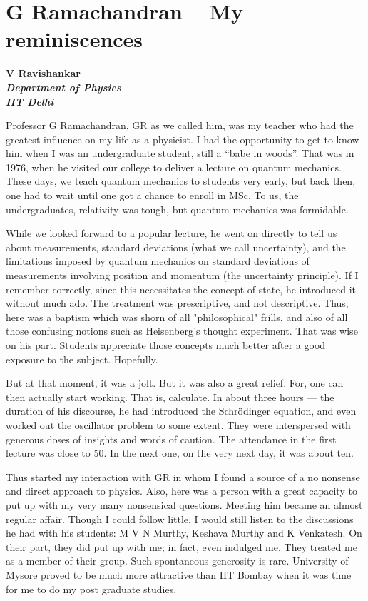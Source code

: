 \chapter[G Ramachandran -- My reminiscences]{\hfill G Ramachandran \break -- My reminiscences}

\begin{center}
\textbf{V Ravishankar}\\
{\it\bfseries Department of Physics}\\
{\it\bfseries IIT Delhi}
\end{center}

Professor G Ramachandran, GR as we called him, was my teacher who had the greatest influence on my life as a physicist. I had the opportunity to get to know him when I was an undergraduate student, still a “babe in woods”. That was in 1976, when he visited our college to deliver a lecture on quantum mechanics. These days, we teach quantum mechanics to students very early, but back then, one had to wait until one got a chance to enroll in MSc. To us, the undergraduates, relativity was tough, but quantum mechanics was formidable.

While we looked forward to a popular lecture, he went on directly to tell us about measurements, standard deviations (what we call uncertainty), and the limitations imposed by quantum mechanics on standard deviations of measurements involving position and momentum (the uncertainty principle). If I remember correctly, since this necessitates the concept of state, he introduced it without much ado. The treatment was prescriptive, and not descriptive.  Thus, here was a baptism which was shorn of all "philosophical" frills, and also of all those confusing notions such as Heisenberg's thought experiment. That was wise on his part. Students appreciate those concepts much better after a good exposure to the subject. Hopefully.

But at that moment, it was a jolt.  But it was also a great relief. For, one can then actually start working. That is, calculate. In about three hours --- the duration of his discourse, he had introduced the Schr\"{o}dinger equation, and even worked out the oscillator problem to some extent. They were interspersed with generous doses of insights and words of caution. The attendance in the first lecture was close to 50. In the next one, on the very next day, it was about ten.

Thus started my interaction with GR in whom I found a source of a no nonsense and direct approach to physics. Also, here was a person with a great capacity to put up with my very many nonsensical questions. Meeting him became an almost regular affair. Though I could follow little, I would still listen to the discussions he had with his students: M V N Murthy, Keshava Murthy and K Venkatesh. On their part, they did put up with me; in fact, even indulged me. They treated me as a member of their group. Such spontaneous generosity is rare. University of Mysore proved to be much more attractive than IIT Bombay when it was time for me to do my post graduate studies.

